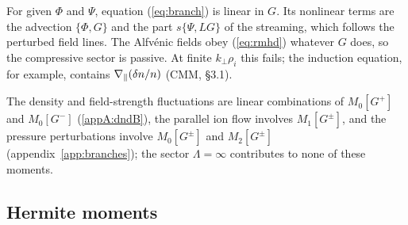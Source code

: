 For given $\Phi$ and $\Psi$, equation (\ref{eq:branch}) is linear in $G$. Its nonlinear terms are the advection $\{\Phi,G\}$ and the part $s\{\Psi,LG\}$ of the streaming, which follows the perturbed field lines. The Alfv\'enic fields obey (\ref{eq:rmhd}) whatever $G$ does, so the compressive sector is passive. At finite $k_\perp\rho_i$ this fails; the induction equation, for example, contains $\nabla_\parallel(\delta n/n)$ (CMM, \S3.1).

The density and field-strength fluctuations are linear combinations of $M_0[G^+]$ and $M_0[G^-]$ (\ref{appA:dndB}), the parallel ion flow involves $M_1[G^\pm]$, and the pressure perturbations involve $M_0[G^\pm]$ and $M_2[G^\pm]$ (appendix~\ref{app:branches}); the sector $\Lambda=\infty$ contributes to none of these moments.

\subsection{Hermite moments}\label{mod:hermite}

